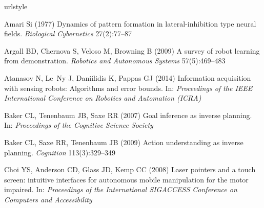 \documentclass[natbib, twocolumn]{svjour3}          %
\begin{document}
\begin{thebibliography}{54}
	\providecommand{\natexlab}[1]{#1}
	\providecommand{\url}[1]{{#1}}
	\providecommand{\urlprefix}{URL }
	\expandafter\ifx\csname urlstyle\endcsname\relax
	\providecommand{\doi}[1]{DOI~\discretionary{}{}{}#1}\else
	\providecommand{\doi}{DOI~\discretionary{}{}{}\begingroup
		\urlstyle{rm}\Url}\fi
	\providecommand{\eprint}[2][]{\url{#2}}
	
	Amari Si (1977) Dynamics of pattern formation in lateral-inhibition type neural
	fields. \textit{Biological Cybernetics} 27(2):77--87
	
	Argall BD, Chernova S, Veloso M, Browning B (2009) A survey of robot learning
	from demonstration. \textit{Robotics and Autonomous Systems} 57(5):469--483
	
	Atanasov N, Le~Ny J, Daniilidis K, Pappas GJ (2014) Information acquisition
	with sensing robots: Algorithms and error bounds. In: \textit{Proceedings of
		the IEEE International Conference on Robotics and Automation (ICRA)}
	
	Baker CL, Tenenbaum JB, Saxe RR (2007) Goal inference as inverse planning. In:
	\textit{Proceedings of the Cognitive Science Society}
	
	Baker CL, Saxe RR, Tenenbaum JB (2009) Action understanding as inverse
	planning. \textit{Cognition} 113(3):329--349
	
	Choi YS, Anderson CD, Glass JD, Kemp CC (2008) Laser pointers and a touch
	screen: intuitive interfaces for autonomous mobile manipulation for the motor
	impaired. In: \textit{Proceedings of the International SIGACCESS Conference
		on Computers and Accessibility}
	

\end{thebibliography}
\end{document}
